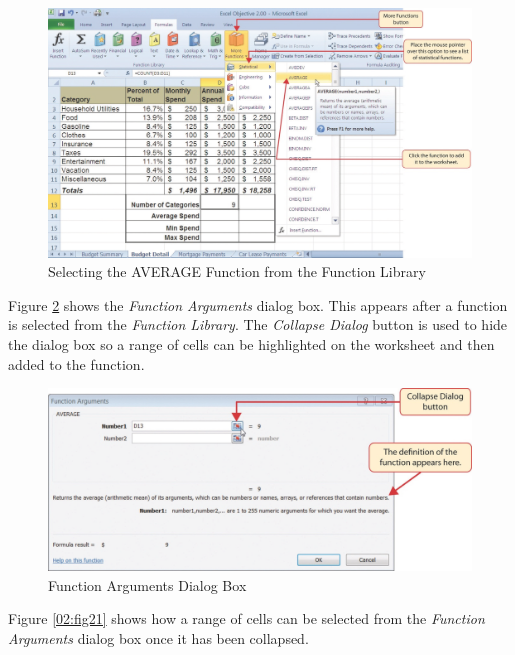 \begin{figure}[H]
	\centering
	\includegraphics[width=\maxwidth{.95\linewidth}]{gfx/ch02_fig19}
	\caption{Selecting the AVERAGE Function from the Function Library}
	\label{02:fig19}
\end{figure}

Figure \ref{02:fig20} shows the \textit{Function Arguments} dialog box. This appears after a function is selected from the \textit{Function Library}. The \textit{Collapse Dialog} button is used to hide the dialog box so a range of cells can be highlighted on the worksheet and then added to the function.

\begin{figure}[H]
	\centering
	\includegraphics[width=\maxwidth{.95\linewidth}]{gfx/ch02_fig20}
	\caption{Function Arguments Dialog Box}
	\label{02:fig20}
\end{figure}

Figure \ref{02:fig21} shows how a range of cells can be selected from the \textit{Function Arguments} dialog box once it has been collapsed.

